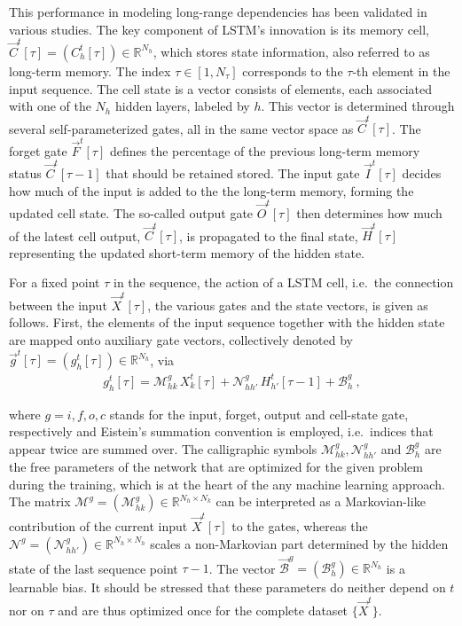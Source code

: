 \documentclass[
]{agujournal2019}
\begin{document}
This performance in modeling long-range dependencies has been validated
in various studies. The key component of LSTM's innovation is its memory
cell, \(\vec{C}^t[\tau] = (C^t_h[\tau]) \in \mathbb{R}^{N_h}\), which
stores state information, also referred to as long-term memory. The
index \(\tau \in [1, N_\tau]\) corresponds to the \(\tau\)-th element in
the input sequence. The cell state is a vector consists of elements,
each associated with one of the \(N_h\) hidden layers, labeled by \(h\).
This vector is determined through several self-parameterized gates, all
in the same vector space as \(\vec{C}^t[\tau]\). The forget gate
\(\vec{F}^t[\tau]\) defines the percentage of the previous long-term
memory status \(\vec{C}^t[\tau-1]\) that should be retained
stored\hspace{0pt}. The input gate \(\vec{I}^t[\tau]\) decides how much
of the input is added to the the long-term memory, forming the updated
cell state. The so-called output gate \(\vec{O}^t[\tau]\) then
determines how much of the latest cell output, \(\vec{C}^t[\tau]\), is
propagated to the final state, \(\vec{H}^t[\tau]\) representing the
updated short-term memory of the hidden state.

For a fixed point \(\tau\) in the sequence, the action of a LSTM cell,
i.e.~the connection between the input \(\vec{X}^t[\tau]\), the various
gates and the state vectors, is given as follows. First, the elements of
the input sequence together with the hidden state are mapped onto
auxiliary gate vectors, collectively denoted by
\(\vec{g}^t[\tau] = (g^t_h[\tau]) \in \mathbb{R}^{N_h}\), via \[
\begin{aligned}
g_h^t[\tau] =  \mathcal{M}^{g}_{hk} \, X^t_k[\tau] +  \mathcal{N}^{g}_{hh'} \, H^t_{h'}[\tau-1] + \mathcal{B}^g_{h} \ ,
\end{aligned}
\]

where \(g=i,f,o,c\) stands for the input, forget, output and cell-state
gate, respectively and Eistein's summation convention is employed,
i.e.~indices that appear twice are summed over. The calligraphic symbols
\(\mathcal{M}^{g}_{hk}, \mathcal{N}^{g}_{hh'}\) and
\(\mathcal{B}^g_{h}\) are the free parameters of the network that are
optimized for the given problem during the training, which is at the
heart of the any machine learning approach. The matrix
\(\pmb{\mathcal{M}}^{g} = (\mathcal{M}^{g}_{hk}) \in \mathbb{R}^{N_h \times N_k}\)
can be interpreted as a Markovian-like contribution of the current input
\(\vec{X}^t[\tau]\) to the gates, whereas the
\(\pmb{\mathcal{N}}^{g} = (\mathcal{N}^{g}_{hh'}) \in \mathbb{R}^{N_h \times N_h}\)
scales a non-Markovian part determined by the hidden state of the last
sequence point \(\tau-1\). The vector
\(\vec{\mathcal{B}}^g = (\mathcal{B}^g_{h}) \in \mathbb{R}^{N_h}\) is a
learnable bias. It should be stressed that these parameters do neither
depend on \(t\) nor on \(\tau\) and are thus optimized once for the
complete dataset \(\{\vec{X}^t\}\).
\end{document}
